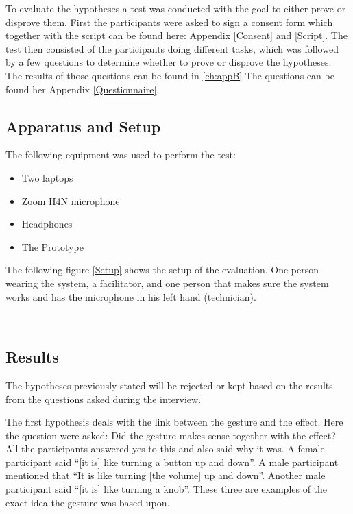 To evaluate the hypotheses a test was conducted with the goal to either prove or disprove them. First the participants were asked to sign a consent form which together with the script can be found here: Appendix \ref{Consent} and \ref{Script}. The test then consisted of the participants doing different tasks, which was followed by a few questions to determine whether to prove or disprove the hypotheses. The results of those questions can be found in \ref{ch:appB} The questions can be found her Appendix \ref{Questionnaire}. 

\subsection{Apparatus and Setup}

The following equipment was used to perform the test:
\begin{itemize}
 \item Two laptops
 \item Zoom H4N microphone 
 \item Headphones
 \item The Prototype
\end{itemize}

The following figure \ref{Setup} shows the setup of the evaluation. One person wearing the system, a facilitator, and one person that makes sure the system works and has the microphone in 
his left hand (technician).

\begin{minipage}{\linewidth}%
\label{Setup}
\end{minipage}\\

\subsection{Results}
The hypotheses previously stated will be rejected or kept based on the results from the questions asked during the interview.

The first hypothesis deals with the link between the gesture and the effect. Here the question were asked: Did the gesture makes sense together with the effect? All the participants answered yes to this and also said why it was. A female participant said “[it is] like turning a button up and down”. A male participant mentioned that “It is like turning [the volume] up and down”. Another male participant said “[it is] like turning a knob”. These three are examples of the exact idea the gesture was based upon.\\ 

